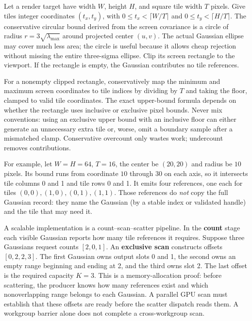 Let a render target have width \(W\), height \(H\), and square tile width \(T\) pixels. Give tiles integer coordinates \((t_x,t_y)\), with \(0\le t_x<\lceil W/T\rceil\) and \(0\le t_y<\lceil H/T\rceil\). The conservative circular bound derived from the screen covariance is a circle of radius \(r=3\sqrt{\lambda_{\max}}\) around projected center \((u,v)\). The actual Gaussian ellipse may cover much less area; the circle is useful because it allows cheap rejection without missing the entire three-sigma ellipse. Clip its screen rectangle to the viewport. If the rectangle is empty, the Gaussian contributes no tile references.

For a nonempty clipped rectangle, conservatively map the minimum and maximum screen coordinates to tile indices by dividing by \(T\) and taking the floor, clamped to valid tile coordinates. The exact upper-bound formula depends on whether the rectangle uses inclusive or exclusive pixel bounds. Never mix conventions: using an exclusive upper bound with an inclusive floor can either generate an unnecessary extra tile or, worse, omit a boundary sample after a mismatched clamp. Conservative overcount only wastes work; undercount removes contributions.

For example, let \(W=H=64\), \(T=16\), the center be \((20,20)\) and radius be \(10\) pixels. Its bound runs from coordinate \(10\) through \(30\) on each axis, so it intersects tile columns 0 and 1 and tile rows 0 and 1. It emits four references, one each for tiles \((0,0),(1,0),(0,1),(1,1)\). Those references do \emph{not} copy the full Gaussian record: they name the Gaussian (by a stable index or validated handle) and the tile that may need it.

A scalable implementation is a count--scan--scatter pipeline. In the \textbf{count} stage each visible Gaussian reports how many tile references it requires. Suppose three Gaussians request counts \([2,0,1]\). An \textbf{exclusive scan} constructs offsets \([0,2,2,3]\). The first Gaussian owns output slots 0 and 1, the second owns an empty range beginning and ending at 2, and the third owns slot 2. The last offset is the required capacity \(K=3\). This is a memory-allocation proof: before scattering, the producer knows how many references exist and which nonoverlapping range belongs to each Gaussian. A parallel GPU scan must establish that these offsets are ready before the scatter dispatch reads them. A workgroup barrier alone does not complete a cross-workgroup scan.

